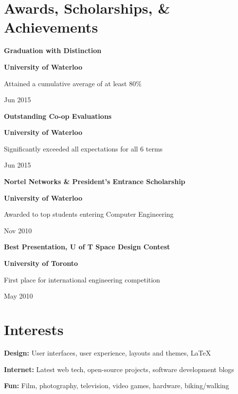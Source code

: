 \documentclass[11pt, letterpaper]{article}
\def\trim#1{\ignorespaces#1\unskip}
\newcommand{\itemtitle}[2]
{ %
  \begin{minipage}[b]{0.7\hsize}
    \begin{flushleft}
      \bfseries
      \trim{#1}
    \end{flushleft}
  \end{minipage}
  \hfill
  \begin{minipage}[b]{0.3\hsize}
    \begin{flushright}
      \bfseries
      \trim{#2}
    \end{flushright}
  \end{minipage}
  \vspace{0.3em}
}
\newcommand{\itemdetail}[2]
{ %
  \begin{minipage}[b]{0.7\hsize}
    \begin{flushleft}
      \trim{#1}
    \end{flushleft}
  \end{minipage}
  \hfill
  \begin{minipage}[b]{0.3\hsize}
    \begin{flushright}
      \trim{#2}
    \end{flushright}
  \end{minipage}
  \vspace{-1em}
}
\begin{document}
\section*{Awards, Scholarships, \& Achievements}

\itemtitle{ Graduation with Distinction }{ University of Waterloo }
\itemdetail{ Attained a cumulative average of at least 80\% }{ Jun 2015 }

\itemtitle{ Outstanding Co-op Evaluations }{ University of Waterloo }
\itemdetail{ Significantly exceeded all expectations for all 6 terms }{ Jun 2015 }

\itemtitle{ Nortel Networks \& President’s Entrance Scholarship }{ University of Waterloo }
\itemdetail{ Awarded to top students entering Computer Engineering }{ Nov 2010 }

\itemtitle{ Best Presentation, U of T Space Design Contest }{ University of Toronto }
\itemdetail{ First place for international engineering competition }{ May 2010 }


\section*{Interests}

\textbf{\trim{ Design: }} User interfaces, user experience, layouts and themes, \LaTeX\

\textbf{\trim{ Internet: }} Latest web tech, open-source projects, software development blogs

\textbf{\trim{ Fun: }} Film, photography, television, video games, hardware, biking/walking
\end{document}
